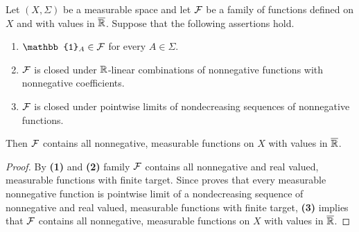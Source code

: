 \begin{proposition}\label{proposition:measurable_induction_for_nonnegative}
    Let $(X,\Sigma)$ be a measurable space and let ${\mathcal F}$ be a family of functions defined on $X$ and with values in $\overline{{\mathbb R}}$. Suppose that the following assertions hold.
    \begin{enumerate}[label=\emph{\textbf{(\arabic*)}}, leftmargin=*]
        \item $\mathbb{1}_A\in \cF$ for every $A\in \Sigma$.
        \item ${\mathcal F}$ is closed under ${\mathbb R}$-linear combinations of nonnegative functions with nonnegative coefficients.
        \item ${\mathcal F}$ is closed under pointwise limits of nondecreasing sequences of nonnegative functions.
    \end{enumerate}
    Then ${\mathcal F}$ contains all nonnegative, measurable functions on $X$ with values in $\overline{{\mathbb R}}$.
\end{proposition}
\begin{proof}
    By \textbf{(1)} and \textbf{(2)} family ${\mathcal F}$ contains all nonnegative and real valued, measurable functions with finite target. Since \cite{Integration} proves that every measurable nonnegative function is pointwise limit of a nondecreasing sequence of nonnegative and real valued, measurable functions with finite target, \textbf{(3)} implies that ${\mathcal F}$ contains all nonnegative, measurable functions on $X$ with values in $\overline{{\mathbb R}}$.
\end{proof}

